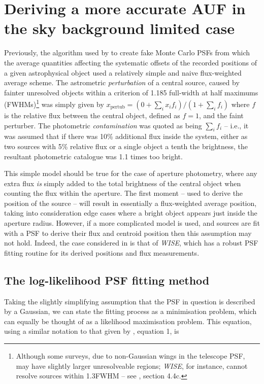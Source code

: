 \documentclass[fleqn,usenatbib]{mnras}
\begin{document}
\section{Deriving a more accurate AUF in the sky background limited case}
Previously, the algorithm used by \cite{2018MNRAS.481.2148W} to create fake Monte Carlo PSFs from which the average quantities affecting the systematic offsets of the recorded positions of a given astrophysical object used a relatively simple and naive flux-weighted average scheme. The astrometric \textit{perturbation} of a central source, caused by fainter unresolved objects within a \citet{1880MNRAS..40..254R} criterion of 1.185 full-width at half maximums (FWHMs)\footnote{Although some surveys, due to non-Gaussian wings in the telescope PSF, may have slightly larger unresolveable regions; \textit{WISE}, for instance, cannot resolve sources within 1.3FWHM -- see \citet{Cutri:2012aa}, section 4.4c.} was simply given by $x_\mathrm{pertub} = (0 + \sum_i x_i f_i) / (1 + \sum_i f_i)$ where $f$ is the relative flux between the central object, defined as $f=1$, and the faint perturber. The photometric \textit{contamination} was quoted as being $\sum_i f_i$ -- i.e., it was assumed that if there was 10\% additional flux inside the system, either as two sources with 5\% relative flux or a single object a tenth the brightness, the resultant photometric catalogue was 1.1 times too bright.

This simple model should be true for the case of aperture photometry, where any extra flux \textit{is} simply added to the total brightness of the central object when counting the flux within the aperture. The first moment -- used to derive the position of the source -- will result in essentially a flux-weighted average position, taking into consideration edge cases where a bright object appears just inside the aperture radius. However, if a more complicated model is used, and sources are fit with a PSF to derive their flux and centroid position then this assumption may not hold. Indeed, the case considered in \citet{2018MNRAS.481.2148W} is that of \textit{WISE}, which has a robust PSF fitting routine for its derived positions and flux measurements.

\subsection{The log-likelihood PSF fitting method}
Taking the slightly simplifying assumption that the PSF in question is described by a Gaussian, we can state the fitting process as a minimisation problem, which can equally be thought of as a likelihood maximisation problem. This equation, using a similar notation to that given by \citet{2018MNRAS.476.4372}, equation 1, is
\end{document}
